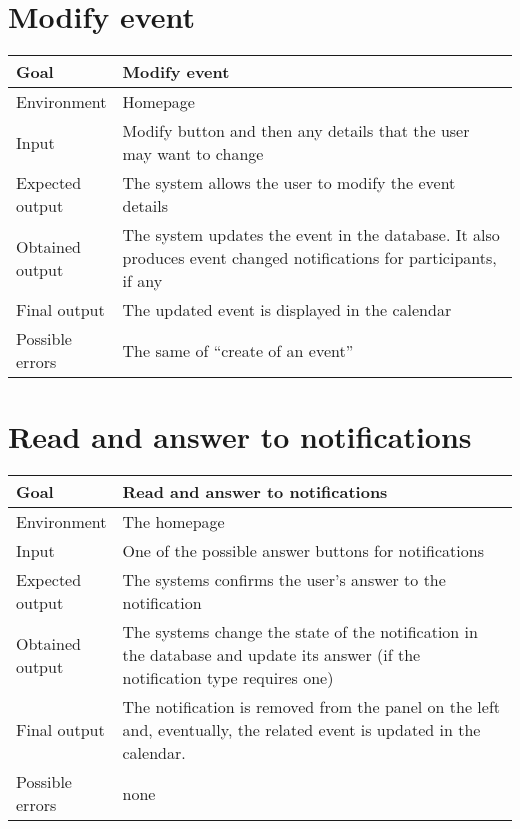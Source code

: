 \documentclass[10pt,a4paper,titlepage]{article}
\begin{document}
\section{Modify event}
\begin{tabular}{| p{0.2\linewidth} | p{0.8\linewidth} |}
\hline Goal & Modify event \\
\hline Environment & Homepage \\
\hline Input & Modify button and then any details that the user may want to change \\
\hline Expected output & The system allows the user to modify the event details \\
\hline Obtained output & The system updates the event in the database. It also produces
event changed notifications for participants, if any \\
\hline Final output & The updated event is displayed in the calendar \\
\hline Possible errors & The same of “create of an event” \\
\hline
\end{tabular}


\section{Read and answer to notifications}
\begin{tabular}{| p{0.2\linewidth} | p{0.8\linewidth} |}
\hline Goal & Read and answer to notifications \\
\hline Environment & The homepage \\
\hline Input & One of the possible answer buttons for notifications \\
\hline Expected output & The systems confirms the user’s answer to the notification \\
\hline Obtained output & The systems change the state of the notification in the database
and update its answer (if the notification type requires one) \\
\hline Final output & The notification is removed from the panel on the left and, eventually,
the related event is updated in the calendar. \\
\hline Possible errors & none\\
\hline
\end{tabular}
\end{document}

